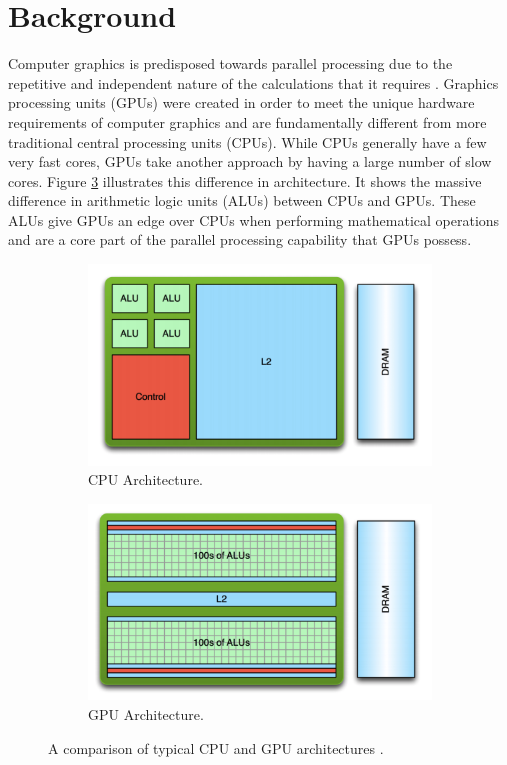 \documentclass{article}
\begin{document}
\section{Background}
Computer graphics is predisposed towards parallel processing due to the repetitive and independent nature of the calculations that it requires \cite[p.~4]{sellers2016}. Graphics processing units (GPUs) were created in order to meet the unique hardware requirements of computer graphics and are fundamentally different from more traditional central processing units (CPUs). While CPUs generally have a few very fast cores, GPUs take another approach by having a large number of slow cores. Figure \ref{fig:architecture} illustrates this difference in architecture. It shows the massive difference in arithmetic logic units (ALUs) between CPUs and GPUs. These ALUs give GPUs an edge over CPUs when performing mathematical operations and are a core part of the parallel processing capability that GPUs possess.

\begin{figure}[h]
    \centering
    \begin{subfigure}[h]{0.39\textwidth}
    	\includegraphics[width=\textwidth]{cpu}
    	\caption{CPU Architecture.}
    	\label{fig:cpu}
    \end{subfigure}
    \begin{subfigure}[h]{0.39\textwidth}
	    \includegraphics[width=\textwidth]{gpu}
	    \caption{GPU Architecture.}
	    \label{fig:gpu}
    \end{subfigure}
	\caption{A comparison of typical CPU and GPU architectures \cite{larkin2016}.}
	\label{fig:architecture}
\end{figure}
\end{document}
